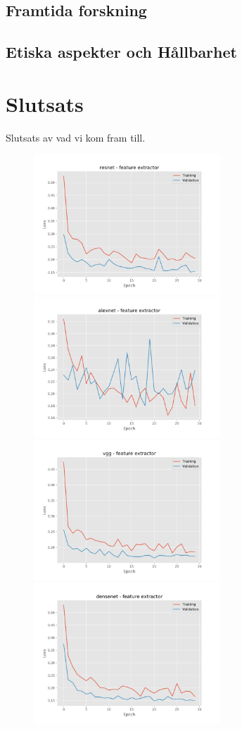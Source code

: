 \documentclass[]{kththesis}
\begin{document}
\section{Framtida forskning}

\section{Etiska aspekter och Hållbarhet}




\chapter{Slutsats}  
Slutsats av vad vi kom fram till.

\printbibliography[heading=bibintoc]
\appendix
  \begin{figure}[h]
    \includegraphics[width=7cm]{b_l_resnet_fe}
    \includegraphics[width=7cm]{b_l_alexnet_fe}
    \includegraphics[width=7cm]{b_l_vgg_fe}
    \includegraphics[width=7cm]{b_l_densenet_fe}

\end{figure}
\end{document}
